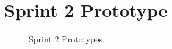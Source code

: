 \section{Sprint 2 Prototype}

	\begin{figure}[tbh]
	\begin{center}
	\end{center}
	\caption{Sprint 2 Prototypes. \label{CommFlow}}
	\end{figure}

